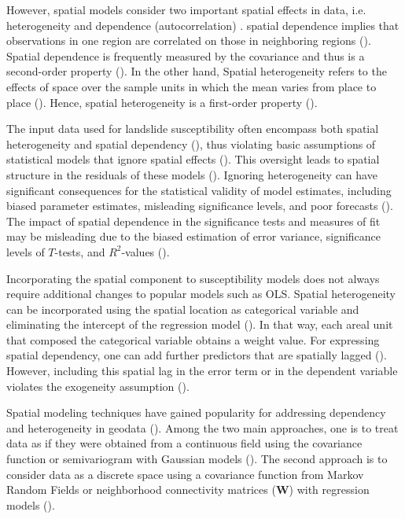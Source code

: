 \documentclass[
  manuscript=article,  
  layout=preprint,  
  year=2023,
  volume=0,
]{format}
\begin{document}
\par However, spatial models consider two important spatial effects in data, i.e. heterogeneity and dependence (autocorrelation) \cite{anselin1988spatial}. spatial dependence implies that observations in one region are correlated on those in neighboring regions (\cite{fletcher2018spatial}). Spatial dependence is frequently measured by the covariance and thus is a second-order property (\cite{wickham2008applied}). In the other hand, Spatial heterogeneity refers to the effects of space over the sample units in which the mean varies from place to place (\cite{zhang2023mapping}). Hence, spatial heterogeneity is a first-order property  (\cite{wang2022statistics}).

\par The input data used for landslide susceptibility often encompass both spatial heterogeneity and spatial dependency (\cite{quevedo2022consideration, lombardo2020space}), thus violating basic assumptions of statistical models that ignore spatial effects (\cite{cressie2015statistics, ripley1988statistical, anselin1988spatial}). This oversight leads to spatial structure in the residuals of these models (\cite{rey2023geographic}). Ignoring heterogeneity can have significant consequences for the statistical validity of model estimates, including biased parameter estimates, misleading significance levels, and poor forecasts (\cite{li2022consequences}). The impact of spatial dependence in the significance tests and measures of fit may be misleading due to the biased estimation of error variance, significance levels of $T$-tests, and $R^2$-values (\cite{anselin1990spatial}).

\par Incorporating the spatial component to susceptibility models does not always require additional changes to popular models such as OLS. Spatial heterogeneity can be incorporated using the spatial location as categorical variable and eliminating the intercept of the regression model (\cite{rey2023geographic}). In that way, each areal unit that composed the categorical variable obtains a weight value.  For expressing spatial dependency, one can add further predictors that are spatially lagged (\cite{rey2023geographic}). However, including this spatial lag in the error term or in the dependent variable violates the exogeneity assumption (\cite{anselin1988spatial}).

\par Spatial modeling techniques have gained popularity for addressing dependency and heterogeneity in geodata (\cite{fotheringham2000quantitative, schabenberger2001contemporary}). Among the two main approaches, one is to treat data as if they were obtained from a continuous field using the covariance function or semivariogram with Gaussian models (\cite{rue2005gaussian}). The second approach is to consider data as a discrete space using a covariance function from Markov Random Fields or neighborhood connectivity matrices (\textbf{W}) with regression models (\cite{anselin1996simple}).
\end{document}
